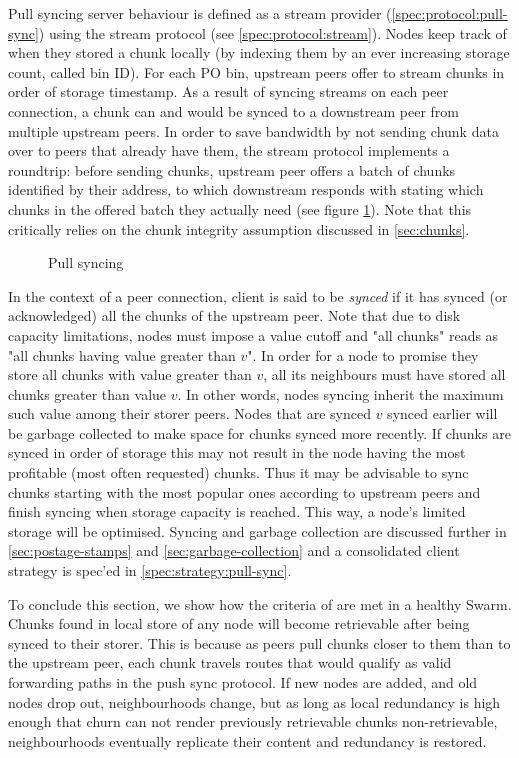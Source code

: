 Pull  syncing server behaviour is defined as a stream provider (\ref{spec:protocol:pull-sync}) using the stream protocol (see \ref{spec:protocol:stream}). Nodes keep track of when they stored a chunk locally (by indexing them by an ever increasing storage count, called bin ID). For each PO bin, upstream peers offer to stream chunks in order of storage timestamp. As a result of syncing streams on each peer connection, a chunk can and would be synced to a downstream peer from multiple upstream peers.  In order to save bandwidth by not sending chunk data over to peers that already have them, the stream protocol implements a roundtrip: before sending chunks, upstream peer offers a batch of chunks identified by their address, to which downstream responds with stating which chunks in the offered batch they actually need (see figure \ref{fig:pull-syncing}). Note that this critically relies on the chunk integrity assumption discussed in \ref{sec:chunks}.


\begin{figure}[htbp]
   \centering
   \caption[Pull syncing]{Pull syncing}
   \label{fig:pull-syncing}
\end{figure}

In the context of a peer connection, client is said to be \emph{synced} if it has synced (or acknowledged) all the chunks of the upstream peer. Note that due to disk capacity limitations, nodes must impose a value cutoff and "all chunks" reads as "all chunks having value greater than $v$". In  order for a node to promise they store all chunks with value greater than $v$, all its neighbours must have stored all chunks greater than value $v$. In other words, nodes syncing   inherit the maximum such value among their storer peers. Nodes that are synced $v$ synced earlier will be garbage collected to make space for chunks synced more recently. If chunks are synced in order of storage this may not result in the node having the most profitable (most often requested) chunks. Thus it may be advisable to sync chunks starting with the most popular ones according to upstream peers and finish syncing when storage capacity is reached. This way, a node's limited storage will be optimised. Syncing and garbage collection are discussed further in \ref{sec:postage-stamps} and \ref{sec:garbage-collection} and a consolidated client strategy is spec'ed in \ref{spec:strategy:pull-sync}.

To conclude this section, we show how the criteria of  are met in a healthy Swarm. Chunks found in local store of any node will become retrievable after being synced to their storer. This is because as peers pull chunks closer to  them than to the upstream peer, each chunk travels routes that would qualify as valid forwarding paths  in the push sync protocol. If new nodes are added, and  old nodes drop  out, neighbourhoods change, but as long as local redundancy is high enough that churn can not render  previously retrievable chunks non-retrievable, neighbourhoods eventually replicate their content and redundancy is restored. 



